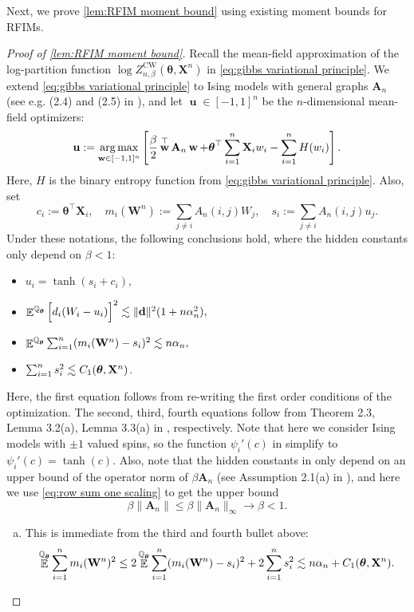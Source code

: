 \documentclass[preprint,reqno]{imsart}
\newcommand{\ttheta}{\boldsymbol{\theta}}
\DeclareMathOperator{\bu}{\textbf{u}}
\DeclareMathOperator{\bw}{\textbf{w}}
\newcommand{\an}{\alpha_{\mathnormal n}}
\DeclareMathOperator{\EE}{\mathbb{E}}
\DeclareMathOperator{\QQ}{\mathbb{Q}}
\newcommand{\A}{\mathbf{A}}
\newcommand{\W}{\mathbf{W}}
\newcommand{\X}{\mathbf{X}}
\DeclareMathOperator{\sumin}{\sum_{\mathnormal i=1}^{\mathnormal n}}
\DeclareMathOperator*{\argmax}{arg\,max}
\begin{document}
\begin{appendix}
Next, we prove \cref{lem:RFIM moment bound} using existing moment bounds for RFIMs. 
\begin{proof}[Proof of \cref{lem:RFIM moment bound}]
Recall the mean-field approximation of the log-partition function $\log Z_{n,\beta}^{\text{CW}}(\ttheta, \X^n)$ in \eqref{eq:gibbs variational principle}. We extend \eqref{eq:gibbs variational principle} to Ising models with general graphs $\A_n$ (see e.g. (2.4) and (2.5) in \cite{lee2024rfim}), and let $\bu \in [-1,1]^n$ be the $n$-dimensional mean-field optimizers:
$$\bu := \argmax_{\mathbf{w} \in [-1,1]^n} \left[\frac{\beta}{2} \bw^\top \A_n \bw + \ttheta^\top \sumin \X_i w_i - \sumin H(w_i)\right].$$
Here, $H$ is the binary entropy function from \eqref{eq:gibbs variational principle}. Also, set 
$$c_i:= \ttheta^\top \X_i, \quad m_i(\W^n) := \sum_{j \neq i} A_n(i,j) W_j, \quad s_i:= \sum_{j \neq i} A_n(i,j)u_j.$$ 
%
Under these notations, the following conclusions hold, where the hidden constants only depend on $\beta < 1$:
\begin{itemize}
    \item $u_i = \tanh(s_i + c_i),$
    \item $\EE^{\QQ_{\ttheta}} \Big[d_i(W_i-u_i)\Big]^2 \lesssim \lVert \mathbf{d} \rVert^2 (1 + n \an^2),$
    \item $\EE^{\QQ_{\ttheta}}\sumin (m_i(\W^n) - s_i)^2 \lesssim n \an,$
    \item $\sumin s_i^2 \lesssim C_1(\ttheta, \X^n)$.
\end{itemize}
Here, the first equation follows from re-writing the first order conditions of the optimization. The second, third, fourth equations follow from Theorem 2.3, Lemma 3.2(a), Lemma 3.3(a) in \cite{lee2024rfim}, respectively. Note that here we consider Ising models with $\pm 1$ valued spins, so the function $\psi_i'(c)$ in \cite{lee2024rfim} simplify to $\psi_i'(c) =\tanh(c)$. Also, note that the hidden constants in \cite{lee2024rfim} only depend on an upper bound of the operator norm of $\beta \A_n$ (see Assumption 2.1(a) in \cite{lee2024rfim}), and here we use \eqref{eq:row sum one scaling} to get the upper bound
$$\beta \|\A_n\| \le \beta \|\A_n\|_{\infty} \to \beta < 1.$$
%

    
\begin{enumerate}[(a)]
    \item This is immediate from the third and fourth bullet above:
    $$\EE^{\QQ_{\ttheta}}\sumin m_i(\W^n)^2 \le 2 \EE^{\QQ_{\ttheta}}\sumin (m_i(\W^n) - s_i)^2 + 2 \sumin s_i^2 \lesssim n\an + C_1(\ttheta, \X^n).$$
    

\end{enumerate}
\end{proof}
\end{appendix}
\end{document}
